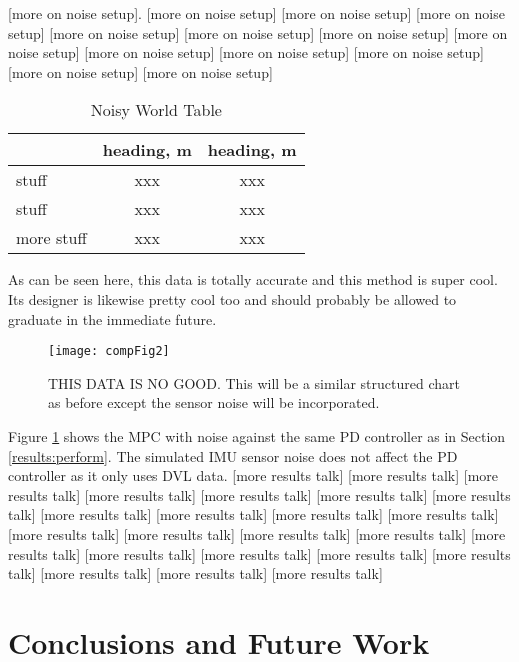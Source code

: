 \documentclass[letterpaper, 10 pt, conferences]{ieeeconf}  %
\begin{document}
[more on noise setup]\cite{GP}. [more on noise setup] [more on noise setup] [more on noise setup] [more on noise setup] [more on noise setup] [more on noise setup] [more on noise setup] [more on noise setup] [more on noise setup] [more on noise setup] [more on noise setup] [more on noise setup]

\begin{table}[h]
\caption{Noisy World Table}
\begin{center}
\def\arraystretch{1.1}%
\begin{tabular}{ |l|c|c| } 
 \hline 
  & heading, m & heading, m \\ 
 \hline
 stuff & xxx & xxx \\ 
 stuff & xxx & xxx \\ 
 more stuff & xxx & xxx \\
 \hline
\end{tabular}
\end{center}
\label{table:noiseData}
\end{table}

As can be seen here, this data is totally accurate and this method is super cool. Its designer is likewise pretty cool too and should probably be allowed to graduate in the immediate future.

\begin{figure}
\texttt{[image: compFig2]}
\centering
\caption{THIS DATA IS NO GOOD. This will be a similar structured chart as before except the sensor noise will be incorporated.} 
\label{fig:noiseErrorComp}
\end{figure}

Figure \ref{fig:noiseErrorComp} shows the MPC with noise against the same PD controller as in Section \ref{results:perform}. The simulated IMU sensor noise does not affect the PD controller as it only uses DVL data. [more results talk] [more results talk] [more results talk] [more results talk] [more results talk] [more results talk] [more results talk] [more results talk] [more results talk] [more results talk] [more results talk] [more results talk] [more results talk] [more results talk] [more results talk] [more results talk] [more results talk] [more results talk] [more results talk] [more results talk] [more results talk] [more results talk] [more results talk]

\section{Conclusions and Future Work} 
\label{sec:conclusion}
\end{document}
